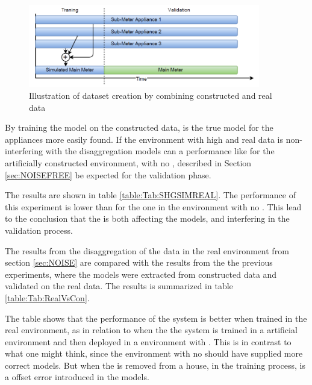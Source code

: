 \begin{figure}[H]
\centering
\includegraphics[width=0.9\textwidth]{billeder/SIMREAL.png}
\caption{Illustration of dataset creation by combining constructed and real data}
\label{fig:SHGSIMREAL}
\end{figure}

By training the model on the constructed data, is the true model for the appliances more easily found. If the environment with high  and real data is non-interfering with the disaggregation models can a performance like for the artificially constructed environment, with no , described in Section \ref{sec:NOISEFREE} be expected for the validation phase. 




The results are shown in table \ref{table:Tab:SHGSIMREAL}. The performance of this experiment is lower than for the one in the environment with no . This lead to the conclusion that the  is both affecting the models, and interfering in the validation process.  

The results from the disaggregation of the data in the real environment from section \ref{sec:NOISE} are compared with the results from the the previous experiments, where the models were extracted from constructed data and validated on the real data. The results is summarized in table \ref{table:Tab:RealVsCon}. 



The table shows that the performance of the system is better when trained in the real environment, as in relation to when the the system is trained in a artificial environment and then deployed in a environment with . This is in contrast to what one might think, since the environment with no  should have supplied more correct models. But when the  is removed from a house, in the training process, is a offset error introduced in the models. 

